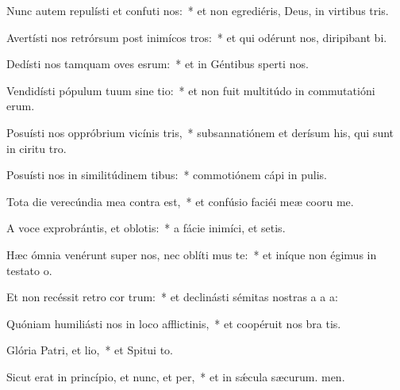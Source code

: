 \item Nunc autem repulísti et confuti nos:~* et non egrediéris, Deus, in virtibus tris.
\item Avertísti nos retrórsum post inimícos tros:~* et qui odérunt nos, diripibant bi.
\item Dedísti nos tamquam oves esrum:~* et in Géntibus sperti nos.
\item Vendidísti pópulum tuum sine tio:~* et non fuit multitúdo in commutatióni erum.
\item Posuísti nos oppróbrium vicínis tris,~* subsannatiónem et derísum his, qui sunt in ciritu tro.
\item Posuísti nos in similitúdinem tibus:~* commotiónem cápi in pulis.
\item Tota die verecúndia mea contra  est,~* et confúsio faciéi meæ cooru me.
\item A voce exprobrántis, et oblotis:~* a fácie inimíci, et setis.
\item Hæc ómnia venérunt super nos, nec oblíti mus te:~* et iníque non égimus in testato o.
\item Et non recéssit retro cor trum:~* et declinásti sémitas nostras a a a:
\item Quóniam humiliásti nos in loco afflictinis,~* et coopéruit nos bra tis.
\item Glória Patri, et lio,~* et Spitui to.
\item Sicut erat in princípio, et nunc, et per,~* et in sǽcula sæcurum. men.
